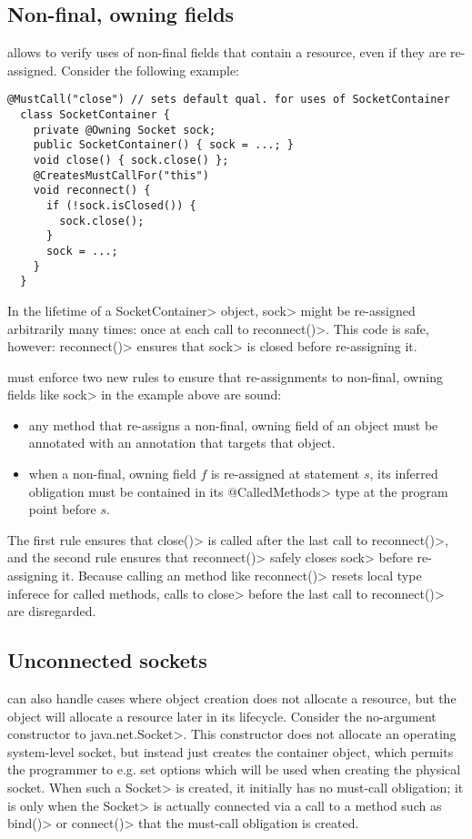 \subsection{Non-final, owning fields}
\label{sec:non-final-owning}

\CreatesMustCallFor allows \tool to verify uses of non-final fields
that contain a resource, even if they are re-assigned. Consider
the following example:

\begin{lstlisting}[frame=tb,belowskip=3mm]
  @MustCall("close") // sets default qual. for uses of SocketContainer
  class SocketContainer {
    private @Owning Socket sock;
    public SocketContainer() { sock = ...; } 
    void close() { sock.close() };
    @CreatesMustCallFor("this")
    void reconnect() {
      if (!sock.isClosed()) {
        sock.close();
      }
      sock = ...;
    }
  }
\end{lstlisting}
In the lifetime of a \<SocketContainer> object, \<sock>
might be re-assigned arbitrarily many times: once at each
call to \<reconnect()>. This code is safe, however: \<reconnect()>
ensures that \<sock> is closed before re-assigning it.

\Tool must enforce two new rules to ensure that
re-assignments to non-final, owning fields like \<sock> in the example
above are sound:
\begin{itemize}
\item any method that re-assigns a non-final, owning field of an object
  must be annotated with an \CreatesMustCallFor annotation
  that targets that object.
\item when a non-final, owning field $f$ is re-assigned at statement $s$,
  its inferred \MustCall obligation must be contained in its \<@CalledMethods>
  type at the program point before $s$.
\end{itemize}
\noindent
The first rule ensures that \<close()> is called after the last call
to \<reconnect()>, and the second rule ensures that \<reconnect()>
safely closes \<sock> before re-assigning it. Because calling
an \CreatesMustCallFor method like \<reconnect()> resets
local type inferece for called methods, calls to \<close>
before the last call to \<reconnect()> are disregarded.

\subsection{Unconnected sockets}
\label{sec:unconnected-sockets}
\CreatesMustCallFor can also handle cases where object creation
does not allocate a resource, but the object will allocate a resource
later in its lifecycle. Consider the no-argument constructor
to \<java.net.Socket>. This constructor does not allocate an
operating system-level socket, but instead just creates the container
object, which permits the programmer to e.g. set options which will be used
when creating the physical socket. When such a \<Socket> is created, it
initially has no must-call obligation; it is only when the \<Socket> is
actually connected via a call to a method such as \<bind()>
or \<connect()> that the must-call obligation is created.

